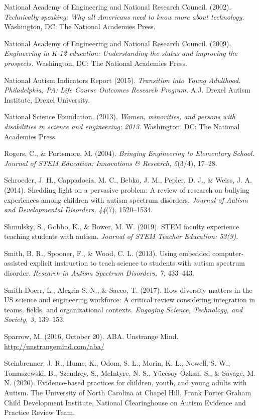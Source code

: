 \documentclass[11.5pt]{sig-alternate}
\begin{document}
National Academy of Engineering and National Research Council. (2002). \textit{Technically speaking: Why all Americans need to know more about technology.} Washington, DC: The National Academies Press. 

National Academy of Engineering and National Research Council. (2009). \textit{Engineering in K-12 education: Understanding the status and improving the prospects.} Washington, DC: The National Academies Press.

National Autism Indicators Report (2015). \textit{Transition into Young Adulthood. Philadelphia, PA: Life Course Outcomes Research Program.} A.J. Drexel Autism Institute, Drexel University.

National Science Foundation. (2013). \textit{Women, minorities, and persons with disabilities in science and engineering: 2013.} Washington, DC: The National Academies Press.

Rogers, C., \& Portsmore, M. (2004). \textit{Bringing Engineering to Elementary School. Journal of STEM Education: Innovations \& Research, 5}(3/4), 17–28.

Schroeder, J. H., Cappadocia, M. C., Bebko, J. M., Pepler, D. J., \& Weiss, J. A. (2014). Shedding light on a pervasive problem: A review of research on bullying experiences among children with autism spectrum disorders. \textit{Journal of Autism and Developmental Disorders, 44}(7), 1520–1534. 

Shmulsky, S., Gobbo, K., \& Bower, M. W. (2019). STEM faculty experience teaching students with autism. \textit{Journal of STEM Teacher Education: 53(9).}

Smith, B. R., Spooner, F., \& Wood, C. L. (2013). Using embedded computer-assisted explicit instruction to teach science to students with autism spectrum disorder. \textit{Research in Autism Spectrum Disorders, 7,} 433–443. 

Smith-Doerr, L., Alegria S. N., \& Sacco, T. (2017). How diversity matters in the US science and engineering workforce: A critical review considering integration in teams, fields, and organizational contexts. \textit{Engaging Science, Technology, and Society, 3,} 139–153. 

Sparrow, M. (2016, October 20). ABA. Unstrange Mind. \url{http://unstrangemind.com/aba/}

Steinbrenner, J. R., Hume, K., Odom, S. L., Morin, K. L., Nowell, S. W., Tomaszewski, B., Szendrey, S., McIntyre, N. S., Yücesoy-Özkan, S., \& Savage, M. N. (2020). Evidence-based practices for children, youth, and young adults with Autism. The University of North Carolina at Chapel Hill, Frank Porter Graham Child Development Institute, National Clearinghouse on Autism Evidence and Practice Review Team.
\end{document}
